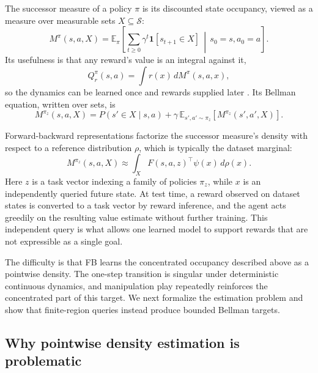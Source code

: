\documentclass{article}
\newcommand{\E}{\mathbb{E}}
\newcommand{\ind}[1]{\mathbf{1}\!\left[#1\right]}
\begin{document}
The successor measure of a policy $\pi$ is its discounted state occupancy, viewed as a measure over measurable sets $X\subseteq\mathcal{S}$:
\begin{equation}
\label{eq:sm}
M^{\pi}(s,a,X)
=
\E_{\pi}\!\left[
\sum_{t\ge0}\gamma^{t}\ind{s_{t+1}\in X}
\,\middle|\,
s_{0}=s,a_{0}=a
\right].
\end{equation}
Its usefulness is that any reward's value is an integral against it,
\begin{equation}
Q_r^{\pi}(s,a)=\int r(x)\,dM^{\pi}(s,a,x),
\end{equation}
so the dynamics can be learned once and rewards supplied later \citep{dayan1993improving,blier2021learning}.
Its Bellman equation, written over sets, is
\begin{equation}
\label{eq:density-bellman}
M^{\pi_z}(s,a,X)
=
P(s'\in X\mid s,a)
+
\gamma\,\E_{s',a'\sim\pi_z}\!\left[M^{\pi_z}(s',a',X)\right].
\end{equation}

Forward-backward representations \citep{touati2021learning,touati2023does} factorize the successor measure's density with respect to a reference distribution $\rho$, which is typically the dataset marginal:
\begin{equation}
\label{eq:fb}
M^{\pi_z}(s,a,X)
\approx
\int_X F(s,a,z)^{\top}\psi(x)\,d\rho(x).
\end{equation}
Here $z$ is a task vector indexing a family of policies $\pi_z$, while $x$ is an independently queried future state.
At test time, a reward observed on dataset states is converted to a task vector by reward inference, and the agent acts greedily on the resulting value estimate without further training.
This independent query is what allows one learned model to support rewards that are not expressible as a single goal.

The difficulty is that FB learns the concentrated occupancy described above as a pointwise density.
The one-step transition is singular under deterministic continuous dynamics, and manipulation play repeatedly reinforces the concentrated part of this target.
We next formalize the estimation problem and show that finite-region queries instead produce bounded Bellman targets.

\subsection{Why pointwise density estimation is problematic}
\label{sec:failure}
\end{document}
